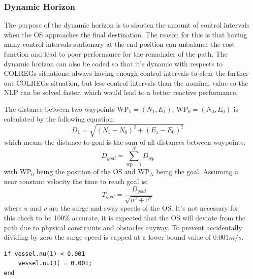 \subsubsection*{Dynamic Horizon}
The purpose of the dynamic horizon is to shorten the amount of control intervals when the \gls{OS} approaches the final destination. The reason for this
is that having many control intervals stationary at the end position can unbalance the cost function and lead to poor performance for the remainder of the path.
The dynamic horizon can also be coded so that it's dynamic with respects to COLREGs situations; always having enough control intervals to clear the further out
COLREGs situation, but less control intervals than the nominal value so the \gls{NLP} can be solved faster, which would lead to a better reactive performance.

The distance between two waypoints $\textrm{WP}_1 = (N_1, E_1)$,  $\textrm{WP}_0 = (N_0, E_0)$  is calculated by the following equation:
\begin{equation} \label{EQ: Distancebetweenpoints}
    D_{1} = \sqrt{(N_1 - N_0)^2 + (E_1 - E_0)^2}
\end{equation}
which means the distance to goal is the sum of all distances between waypoints:
\begin{equation}
    D_{goal} = \sum_{\textrm{wp} = 1}^{N} D_{wp}
\end{equation}
with $\textrm{WP}_0$ being the position of the \gls{OS} and $\textrm{WP}_N$ being the goal. Assuming a near constant velocity the time to
reach goal is:
\begin{equation}
    T_{goal} = \frac{D_{goal}}{\sqrt{u^2 + v^2}}
\end{equation}
where $u$ and $v$ are the surge and sway speeds of the \gls{OS}. It's not necessary for this check to be 100\% accurate, it is expected that the \gls{OS} will deviate from the
path due to physical constraints and obstacles anyway. To prevent accidentally dividing by zero the surge speed is capped at a lower bound value of $0.001m/s$.
\begin{lstlisting}
if vessel.nu(1) < 0.001
    vessel.nu(1) = 0.001;
end
\end{lstlisting}

